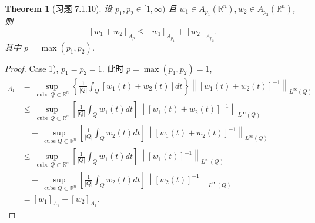 \documentclass[a4paper,11pt]{article}
\newtheorem{theorem}{Theorem}[section]
\theoremstyle{definition}
\begin{document}
\begin{CJK*}{UTF8}{gbsn}
\begin{theorem}[习题 7.1.10]
    设 $ p_1, p_2 \in [1, \infty) $ 且 $ w_1 \in A_{p_1}(\mathbb{R}^n), w_2 \in A_{p_2}(\mathbb{R}^n) $, 则
    $$
        [w_1 + w_2]_{A_p} \leq [w_1]_{A_{p_1}} + [w_2]_{A_{p_2}}.
    $$
    其中 $ p = \max(p_1, p_2) $.
\end{theorem}

\begin{proof}
    Case 1), $ p_1 = p_2 = 1 $. 此时 $ p = \max(p_1, p_2) = 1 $,
    \begin{align*}
        [w_1 + w_2]_{A_1} 
            &= \sup_{\text{ cube } Q \subset \mathbb{R}^n} 
                \left\{ \frac{1}{|Q|} \int_Q [w_1(t) + w_2(t)] dt \right\} 
                \left\| [w_1(t) + w_2(t)]^{-1} \right\|_{L^\infty (Q)} \\
            &\leq \sup_{\text{ cube } Q \subset \mathbb{R}^n} 
                \left[ \frac{1}{|Q|} \int_Q w_1(t) dt \right]
                \left\| [w_1(t) + w_2(t)]^{-1} \right\|_{L^\infty (Q)} \\
                &\quad+ \sup_{\text{ cube } Q \subset \mathbb{R}^n} 
                    \left[ \frac{1}{|Q|} \int_Q w_2(t) dt \right]
                    \left\| [w_1(t) + w_2(t)]^{-1} \right\|_{L^\infty (Q)} \\
            &\leq \sup_{\text{ cube } Q \subset \mathbb{R}^n} 
                \left[ \frac{1}{|Q|} \int_Q w_1(t) dt \right]
                \left\| [w_1(t)]^{-1} \right\|_{L^\infty (Q)} \\
                &\quad+ \sup_{\text{ cube } Q \subset \mathbb{R}^n} 
                    \left[ \frac{1}{|Q|} \int_Q w_2(t) dt \right]
                    \left\| [w_2(t)]^{-1} \right\|_{L^\infty (Q)} \\
            &= [w_1]_{A_1} + [w_2]_{A_1}.
    \end{align*}
    

\end{proof}
\end{CJK*}
\end{document}
